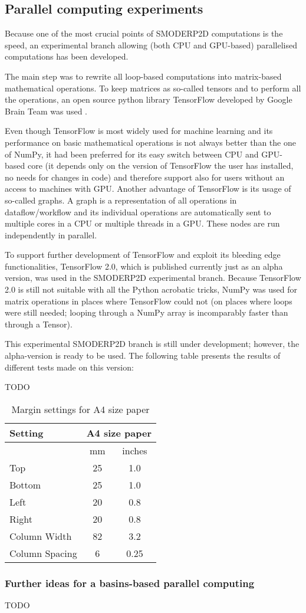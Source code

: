 \subsection{Parallel computing experiments}

Because one of the most crucial points of SMODERP2D computations is
the speed, an experimental branch allowing (both CPU and GPU-based)
parallelised computations has been developed.

The main step was to rewrite all loop-based computations into
matrix-based mathematical operations. To keep matrices as so-called
tensors and to perform all the operations, an open source python
library TensorFlow developed by Google Brain Team was used \cite{xxx}.

Even though TensorFlow is most widely used for machine learning and
its performance on basic mathematical operations is not always better
than the one of NumPy, it had been preferred for its easy switch
between CPU and GPU-based core (it depends only on the version of
TensorFlow the user has installed, no needs for changes in code) and
therefore support also for users without an access to machines with
GPU. Another advantage of TensorFlow is its usage of so-called
graphs. A graph is a representation of all operations in
dataflow/workflow and its individual operations are automatically sent
to multiple cores in a CPU or multiple threads in a GPU. These nodes
are run independently in parallel.

To support further development of TensorFlow and exploit its bleeding
edge functionalities, TensorFlow 2.0, which is published currently
just as an alpha version, was used in the SMODERP2D experimental
branch. Because TensorFlow 2.0 is still not suitable with all the
Python acrobatic tricks, NumPy was used for matrix operations in
places where TensorFlow could not (on places where loops were still
needed; looping through a NumPy array is incomparably faster than
through a Tensor).

This experimental SMODERP2D branch is still under development;
however, the alpha-version is ready to be used. The following table
presents the results of different tests made on this version:

TODO

\begin{table}[h]
  \centering
  \begin{tabular}{|l|c|c|}\hline
    Setting&\multicolumn{2}{c|}{A4 size paper}\\\hline
    &mm&inches\\
    Top&25&1.0\\
    Bottom&25&1.0\\
    Left&20&0.8\\
    Right&20&0.8\\
    Column Width&82&3.2\\
    Column Spacing&6&0.25\\\hline
  \end{tabular}
  \caption{Margin settings for A4 size paper}
  \label{tab:Margin_settings}
\end{table}

\subsubsection{Further ideas for a basins-based parallel computing}

TODO
